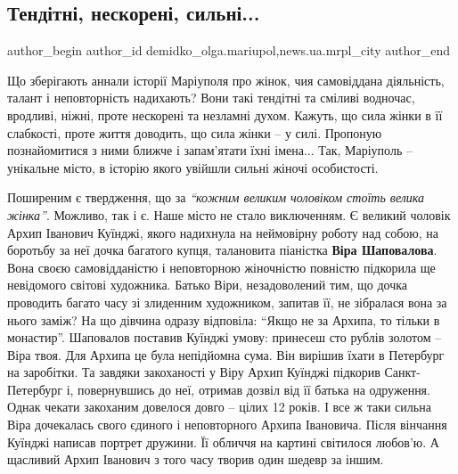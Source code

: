  
 
 
 
 
 
\subsection{Тендітні, нескорені, сильні...}
\label{sec:08_03_2018.stz.news.ua.mrpl_city.1.tenditni_neskoreni_sylni}
 
\ifcmt
 author_begin
   author_id demidko_olga.mariupol,news.ua.mrpl_city
 author_end
\fi


Що зберігають аннали історії Маріуполя про жінок, чия самовіддана діяльність,
талант і неповторність надихають? Вони такі тендітні та сміливі водночас,
вродливі, ніжні, проте нескорені та незламні духом. Кажуть, що сила жінки в її
слабкості, проте життя доводить, що сила жінки – у силі. Пропоную познайомитися
з ними ближче і запам'ятати їхні імена... Так, Маріуполь – унікальне місто, в
історію якого увійшли сильні жіночі особистості.

Поширеним є твердження, що за \emph{\enquote{кожним великим чоловіком стоїть велика жінка}}.
Можливо, так і є. Наше місто не стало виключенням. Є великий чоловік Архип
Іванович Куїнджі, якого надихнула на неймовірну роботу над собою, на боротьбу
за неї дочка багатого купця, талановита піаністка \textbf{Віра Шаповалова}. Вона своєю
самовідданістю і неповторною жіночністю повністю підкорила ще невідомого
світові художника. Батько Віри, незадоволений тим, що дочка проводить багато
часу зі злиденним художником, запитав її, не зібралася вона за нього заміж? На
що дівчина одразу відповіла: \enquote{Якщо не за Архипа, то тільки в монастир}.
Шаповалов поставив Куїнджі умову: принесеш сто рублів золотом – Віра твоя. Для
Архипа це була непідйомна сума. Він вирішив їхати в Петербург на заробітки. Та
завдяки закоханості у Віру Архип Куїнджі підкорив Санкт-Петербург і,
повернувшись до неї, отримав дозвіл від її батька на одруження. Однак чекати
закоханим довелося довго – цілих 12 років. І все ж таки сильна Віра дочекалась
свого єдиного і неповторного Архипа Івановича. Після вінчання Куїнджі написав
портрет дружини. Її обличчя на картині світилося любов'ю. А щасливий Архип
Іванович з того часу творив один шедевр за іншим.

